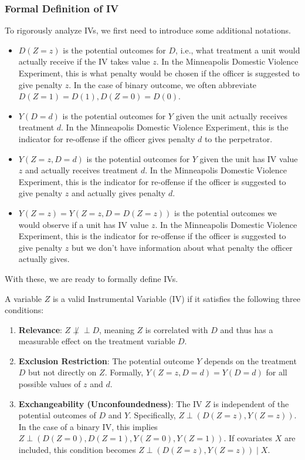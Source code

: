 \subsubsection{Formal Definition of IV}
To rigorously analyze IVs, we first need to introduce some additional notations. 
\begin{itemize}
    \item \(D(Z = z)\) is the potential outcomes for \(D\), i.e., what treatment a unit would actually receive if the IV takes value $z$. In the Minneapolis Domestic Violence Experiment, this is what penalty would be chosen if the officer is suggested to give penalty \(z\). In the case of binary outcome, we often abbreviate \(D(Z = 1) = D(1), D(Z = 0) = D(0)\).
    \item \(Y(D = d)\) is the potential outcomes for \(Y\) given the unit actually receives treatment \(d\). In the Minneapolis Domestic Violence Experiment, this is the indicator for re-offense if the officer gives penalty \(d\) to the perpetrator. 
    \item \(Y(Z = z, D = d)\) is the potential outcomes for \(Y\) given the unit has IV value \(z\) and actually receives treatment \(d\). In the Minneapolis Domestic Violence Experiment, this is the indicator for re-offense if the officer is suggested to give penalty \(z\) and actually gives penalty \(d\). 
    \item \(Y(Z = z) = Y(Z = z, D = D(Z = z))\) is the potential outcomes we would observe if a unit has IV value $z$. In the Minneapolis Domestic Violence Experiment, this is the indicator for re-offense if the officer is suggested to give penalty \(z\) but we don't have information about what penalty the officer actually gives. 
\end{itemize}
With these, we are ready to formally define IVs. 
\begin{definition}
    A variable \(Z\) is a valid Instrumental Variable (IV) if it satisfies the following three conditions:  
    \begin{enumerate}
        \item \textbf{Relevance}: \(Z \not \perp\!\!\!\perp D\), meaning \(Z\) is correlated with \(D\) and thus has a measurable effect on the treatment variable \(D\).  
        \item \textbf{Exclusion Restriction}: The potential outcome \(Y\) depends on the treatment \(D\) but not directly on \(Z\). Formally, \(Y(Z = z, D = d) = Y(D = d)\) for all possible values of \(z\) and \(d\).  
        \item \textbf{Exchangeability (Unconfoundedness)}: The IV \(Z\) is independent of the potential outcomes of \(D\) and \(Y\). Specifically, \(Z \perp (D(Z = z), Y(Z = z))\). In the case of a binary IV, this implies \(Z \perp (D(Z = 0), D(Z = 1), Y(Z = 0), Y(Z = 1))\). If covariates \(X\) are included, this condition becomes \(Z \perp (D(Z = z), Y(Z = z)) \mid X\).  
    \end{enumerate}
\end{definition}

